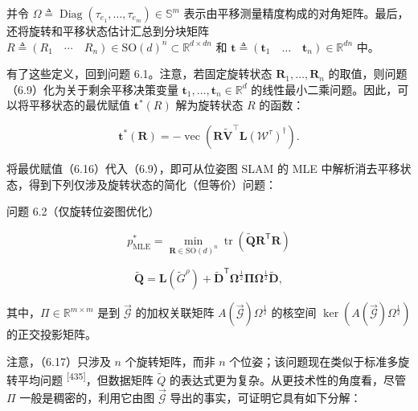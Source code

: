 并令 $\Omega \triangleq \operatorname { D i a g } ( \tau _ { e _ { 1 } } , \dots , \tau _ { e _ { m } } ) \in \mathbb { S } ^ { m }$ 表示由平移测量精度构成的对角矩阵。最后，还将旋转和平移状态估计汇总到分块矩阵 $R \triangleq \left( R _ { 1 } \quad \cdots \quad R _ { n } \right) \in { \mathrm { S O } } ( d ) ^ { n } \subset \mathbb { R } ^ { d \times d n }$ 和 $\pmb { t } \triangleq \left( \pmb { t } _ { 1 } \quad \ldots \quad \pmb { t } _ { n } \right) \in \mathbb { R } ^ { d n }$ 中。

有了这些定义，回到问题 6.1。注意，若固定旋转状态 $\pmb { R } _ { 1 } , \ldots , \pmb { R } _ { n }$ 的取值，则问题（6.9）化为关于剩余平移决策变量 $\boldsymbol { t } _ { 1 } , \ldots , \boldsymbol { t } _ { n } \in \mathbb { R } ^ { d }$ 的线性最小二乘问题。因此，可以将平移状态的最优赋值 $\pmb t ^ { * } ( R )$ 解为旋转状态 $R$ 的函数：

\begin{equation}
\boldsymbol {t} ^ {*} (\boldsymbol {R}) = - \operatorname{vec} \left(\boldsymbol {R} \tilde {\boldsymbol {V}} ^ {\top} \boldsymbol {L} \left(\mathcal {W} ^ {\tau}\right) ^ {\dagger}\right).\tag{6.16}
\end{equation}

将最优赋值（6.16）代入（6.9），即可从位姿图 SLAM 的 MLE 中解析消去平移状态，得到下列仅涉及旋转状态的简化（但等价）问题：

问题 6.2（仅旋转位姿图优化）

\begin{equation}
p _ {\mathrm{MLE}} ^ {*} = \min _ {\boldsymbol {R} \in \mathrm{SO} (d) ^ {n}} \operatorname{tr} \left(\tilde {\boldsymbol {Q}} \boldsymbol {R} ^ {\mathsf {T}} \boldsymbol {R}\right)\tag{6.17a}
\end{equation}

\begin{equation}
\tilde {\boldsymbol {Q}} = \boldsymbol {L} (\tilde {G} ^ {\rho}) + \tilde {\boldsymbol {D}} ^ {\mathsf {T}} \boldsymbol {\Omega} ^ {\frac {1}{2}} \boldsymbol {\Pi} \boldsymbol {\Omega} ^ {\frac {1}{2}} \tilde {\boldsymbol {D}},\tag{6.17b}
\end{equation}

其中，$\Pi \in \mathbb { R } ^ {m \times m}$ 是到 $\overrightarrow {\mathcal { G } }$ 的加权关联矩阵 $A ( \overrightarrow {\mathcal { G } } ) \Omega ^ { \frac { 1 } { 2 } }$ 的核空间 $\ker ( A ( { \overrightarrow { \mathcal { G } } } ) \Omega ^ { \frac { 1 } { 2 } } )$ 的正交投影矩阵。

注意，（6.17）只涉及 $n$ 个旋转矩阵，而非 $n$ 个位姿；该问题现在类似于标准多旋转平均问题 \textsuperscript{[435]}，但数据矩阵 $\tilde { Q }$ 的表达式更为复杂。从更技术性的角度看，尽管 $\Pi$ 一般是稠密的，利用它由图 $\overrightarrow { \mathcal { G } }$ 导出的事实，可证明它具有如下分解：

